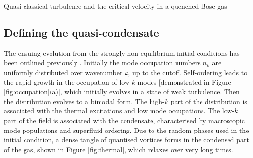 \begin{chapter}{\label{cha:nonequib}Quasi-classical turbulence and the critical velocity in a quenched Bose gas}
\subsection{Defining the quasi-condensate}
The ensuing evolution from the strongly non-equilibrium initial conditions has been outlined previously \cite{PhysRevA.66.013603,pattinson_2014}.  Initially the mode occupation numbers $n_k$ are uniformly distributed over wavenumber $k$, up to the cutoff.  Self-ordering leads to the rapid growth in the occupation of low-$k$ modes [demonstrated in Figure \ref{fig:occupation}(a)], which initially evolves in a state of weak turbulence. Then the distribution evolves to a bimodal form.
The high-$k$ part of the distribution is associated with the
thermal excitations and low mode occupations. The low-$k$ part of the field is associated with the condensate, characterised by macroscopic mode populations and superfluid ordering. Due to the random phases used in the initial condition, a dense tangle of quantised vortices forms in the condensed part of the gas, shown in Figure \ref{fig:thermal}, which relaxes over very long times.


\end{chapter}
